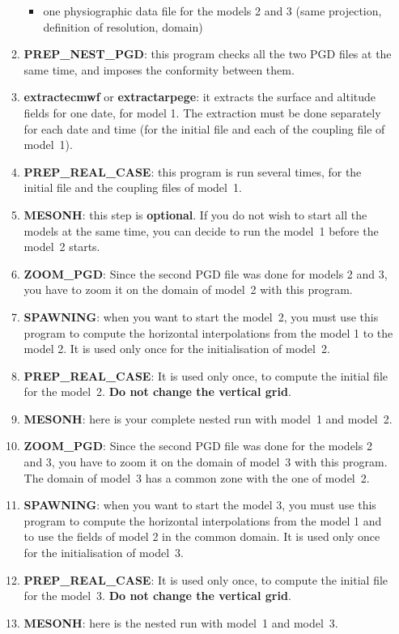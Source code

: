 \begin{itemize}
\begin{enumerate}
\begin{itemize}
\item one physiographic data file for the models 2 and 3 (same projection,
definition of resolution, domain)
\end{itemize} 
\item
{\bf PREP\_NEST\_PGD}: this program checks all the two PGD files at the same 
time, and imposes the conformity between them.
\item
{\bf extractecmwf} or {\bf extractarpege}: it extracts the surface
and altitude fields for one date, for model 1.
The extraction must be done separately for each date and time (for
the initial file and each of the coupling file of model~1).
\item 
{\bf PREP\_REAL\_CASE}: this program is run several times, for the initial
file and the coupling files of model~1.
\item 
{\bf MESONH}: this step is {\bf optional}. If you do not wish to start 
all the models at the same time, you can decide to run the model~1 before
the model~2 starts.
\item
{\bf ZOOM\_PGD}: Since the second PGD file was done for models
2 and 3, you have to zoom it on the domain of model~2 with this program.
\item
{\bf SPAWNING}: when you want to start the model~2, you must use this
program to compute the horizontal interpolations from the model 1 to the model
2. It is used only once for the initialisation of model~2.
\item 
{\bf PREP\_REAL\_CASE}: It is used only once, to compute the
initial file for the model~2. {\bf Do not change the vertical grid}.
\item 
{\bf MESONH}: here is your complete nested run with model~1 and model~2.
\item
{\bf ZOOM\_PGD}: Since the second PGD file was done for the models
2 and 3, you have to zoom it on the domain of model~3 with this program.
The domain of model~3 has a common zone with the one of model~2.
\item
{\bf SPAWNING}: when you want to start the model 3, you must use this
program to compute the horizontal interpolations from the model 1 and to 
use the fields of model 2 in the common domain.
It is used only once for the initialisation of model~3.
\item 
{\bf PREP\_REAL\_CASE}: It is used only once, to compute the
initial file for the model~3. {\bf Do not change the vertical grid}.
\item 
{\bf MESONH}: here is the nested run with model~1 and model~3.


\end{enumerate}
\end{itemize}
